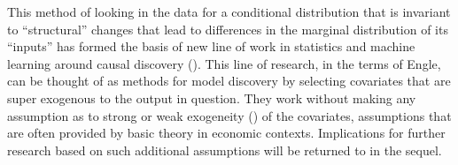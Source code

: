 \documentclass[a4paper,12pt]{article}
\begin{document}
This method of looking in the data for a conditional distribution that is invariant to ``structural'' changes that lead to differences in the marginal distribution of its ``inputs'' has formed the basis of new line of work in statistics and machine learning around causal discovery (\cite{Peters2015, Heinze-deml2017, Rojas-carulla2018}). This line of research, in the terms of Engle, can be thought of as methods for model discovery by selecting covariates that are super exogenous to the output in question. They work without making any assumption as to strong or weak exogeneity (\cite[in the sense of][]{Engle1983}) of the covariates, assumptions that are often provided by basic theory in economic contexts. Implications for further research based on such additional assumptions will be returned to in the sequel. 





\end{document}
